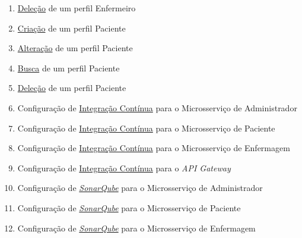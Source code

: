 \begin{apendicesenv}
\begin{enumerate}
    \item \href{https://github.com/PillWatcher/pillwatcher-dpb-nursing-service/blob/master/src/main/java/br/com/pillwatcher/dpb/services/impl/NurseServiceImpl.java#L98}{Deleção} de um perfil Enfermeiro
    \item \href{https://github.com/PillWatcher/pillwatcher-dpb-patient-service/blob/dev/src/main/java/br/com/pillwatcher/dpb/services/impl/PatientServiceImpl.java#L42}{Criação} de um perfil Paciente
    \item \href{https://github.com/PillWatcher/pillwatcher-dpb-patient-service/blob/dev/src/main/java/br/com/pillwatcher/dpb/services/impl/PatientServiceImpl.java#L75}{Alteração} de um perfil Paciente
    \item \href{https://github.com/PillWatcher/pillwatcher-dpb-patient-service/blob/dev/src/main/java/br/com/pillwatcher/dpb/services/impl/PatientServiceImpl.java#L113}{Busca} de um perfil Paciente
    \item \href{https://github.com/PillWatcher/pillwatcher-dpb-patient-service/blob/dev/src/main/java/br/com/pillwatcher/dpb/services/impl/PatientServiceImpl.java#L166}{Deleção} de um perfil Paciente
    \item Configuração de \href{https://github.com/PillWatcher/pillwatcher-dpb-admin-service/blob/master/.travis.yml}{Integração Contínua} para o Microsserviço de Administrador
    \item Configuração de \href{https://github.com/PillWatcher/pillwatcher-dpb-patient-service/blob/master/.travis.yml}{Integração Contínua} para o Microsserviço de Paciente
    \item Configuração de \href{https://github.com/PillWatcher/pillwatcher-dpb-nursing-service/blob/master/.travis.yml}{Integração Contínua} para o Microsserviço de Enfermagem
    \item Configuração de \href{https://github.com/PillWatcher/pillwatcher-api-gateway/blob/master/.travis.yml}{Integração Contínua} para o \textit{API Gateway}
    \item Configuração de \href{https://github.com/PillWatcher/pillwatcher-dpb-admin-service/blob/master/sonar-project.properties}{\textit{SonarQube}} para o Microsserviço de Administrador
    \item Configuração de \href{https://github.com/PillWatcher/pillwatcher-dpb-patient-service/blob/master/sonar-project.properties}{\textit{SonarQube}} para o Microsserviço de Paciente
    \item Configuração de \href{https://github.com/PillWatcher/pillwatcher-dpb-nursing-service/blob/master/sonar-project.properties}{\textit{SonarQube}} para o Microsserviço de Enfermagem

\end{enumerate}
\end{apendicesenv}
